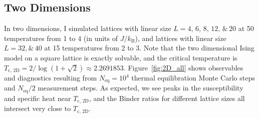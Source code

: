 \documentclass[11pt, oneside]{article}
\newcommand{\kB}{k_\text{B}}
\begin{document}
\subsection{Two Dimensions}
In two dimensions, I simulated lattices with linear size $L=4,\,6,\,8,\,12,\,\&\,20$ at 50 temperatures from 1 to 4 (in units of $J/\kB$), and lattices with linear size $L=32,\&\,40$ at 15 temperatures from 2 to 3. Note that the two dimensional Ising model on a square lattice is exactly solvable, and the critical temperature is $T_\text{c, 2D}=2/\log(1+\sqrt2)\approx2.2691853$. Figure~\ref{fig:2D_all} shows observables and diagnostics resulting from $N_\text{eq}=10^4$ thermal equilibration Monte Carlo steps and $N_\text{eq}/2$ measurement steps. As expected, we see peaks in the susceptibility and specific heat near $T_\text{c, 2D}$, and the Binder ratios for different lattice sizes all intersect very close to $T_\text{c, 2D}$.
\end{document}
